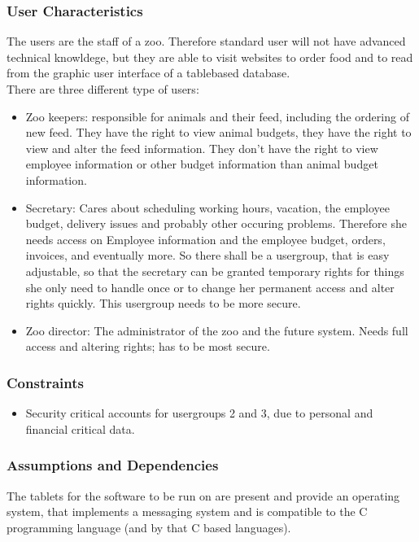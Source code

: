 	\subsubsection{User Characteristics}
		The users are the staff of a zoo. Therefore standard user will not have advanced technical knowldege, but they are able to visit websites to order food and to read from the graphic user interface of a tablebased database. \\
		There are three different type of users: \\
		\begin{itemize}
			\item Zoo keepers: responsible for animals and their feed, including the ordering of new feed. They have the right to view animal budgets, they have the right to view and alter the feed information. They don't have the right to view employee information or other budget information than animal budget information. \\
			\item Secretary: Cares about scheduling working hours, vacation, the employee budget, delivery issues and probably other occuring problems. Therefore she needs access on Employee information and the employee budget, orders, invoices, and eventually more. So there shall be a usergroup, that is easy adjustable, so that the secretary can be granted temporary rights for things she only need to handle once or to change her permanent access and alter rights quickly. This usergroup needs to be more secure. \\
		 	\item Zoo director: The administrator of the zoo and the future system. Needs full access and altering rights; has to be most secure.
		\end{itemize}

	\subsubsection{Constraints}
		\begin{itemize}
			\item Security critical accounts for usergroups 2 and 3, due to personal and financial critical data.
		\end{itemize}

	\subsubsection{Assumptions and Dependencies}
		The tablets for the software to be run on are present and provide an operating system, that implements a messaging system and is compatible to the C programming language (and by that C based languages).


